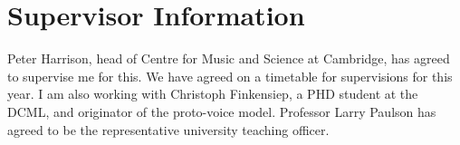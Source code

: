 \documentclass{article}
\begin{document}
\section{Supervisor Information} 
Peter Harrison, head of Centre for Music and Science at Cambridge, has agreed to supervise me for this. 
We have agreed on a timetable for supervisions for this year. I am also working with Christoph Finkensiep, a PHD student at the DCML, and originator of the proto-voice model.
Professor Larry Paulson has agreed to be the representative university teaching officer.

{}

\end{document}
